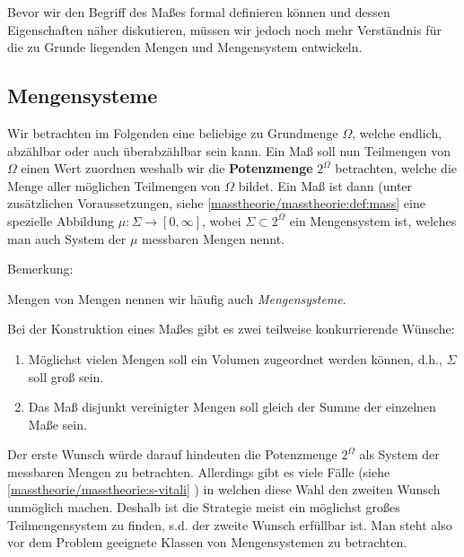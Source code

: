 \par
Bevor wir den Begriff des Maßes formal definieren können und dessen Eigenschaften näher diskutieren, müssen wir jedoch noch mehr Verständnis für die zu Grunde liegenden Mengen und Mengensystem entwickeln.


\subsection{Mengensysteme}
\label{\detokenize{masstheorie/masstheorie:mengensysteme}}\label{\detokenize{masstheorie/masstheorie:s-sigmaalg}}
\par
Wir betrachten im Folgenden eine beliebige zu Grundmenge \(\Omega\), welche endlich, abzählbar oder auch überabzählbar sein kann. Ein Maß soll nun Teilmengen von \(\Omega\) einen Wert zuordnen weshalb wir die \textbf{Potenzmenge} \(2^\Omega\) betrachten, welche die Menge aller möglichen Teilmengen von \(\Omega\) bildet. Ein Maß ist dann (unter zusätzlichen Voraussetzungen, siehe \cref{masstheorie/masstheorie:def:mass}  eine spezielle Abbildung \(\mu:\Sigma\to[0,\infty]\), wobei \(\Sigma\subset 2^\Omega\) ein Mengensystem ist, welches man auch System der \(\mu\) messbaren Mengen nennt.

\begin{emphBox}{}{}{Bemerkung:}
\par
Mengen von Mengen nennen wir häufig auch \emph{Mengensysteme}.
\end{emphBox}

\par
Bei der Konstruktion eines Maßes gibt es zwei teilweise konkurrierende Wünsche:
\begin{enumerate}

\item {} 
\par
Möglichst vielen Mengen soll ein Volumen zugeordnet werden können, d.h., \(\Sigma\) soll groß sein.

\item {} 
\par
Das Maß disjunkt vereinigter Mengen soll gleich der Summe der einzelnen Maße sein.

\end{enumerate}

\par
Der erste Wunsch würde darauf hindeuten die Potenzmenge \(2^\Omega\) als System der messbaren Mengen zu betrachten. Allerdings gibt es viele Fälle (siehe \cref{masstheorie/masstheorie:s-vitali} ) in welchen diese Wahl den zweiten Wunsch unmöglich machen. Deshalb ist die Strategie meist ein möglichst großes Teilmengensystem zu finden, s.d. der zweite Wunsch erfüllbar ist. Man steht also vor dem Problem geeignete Klassen von Mengensystemen zu betrachten.

